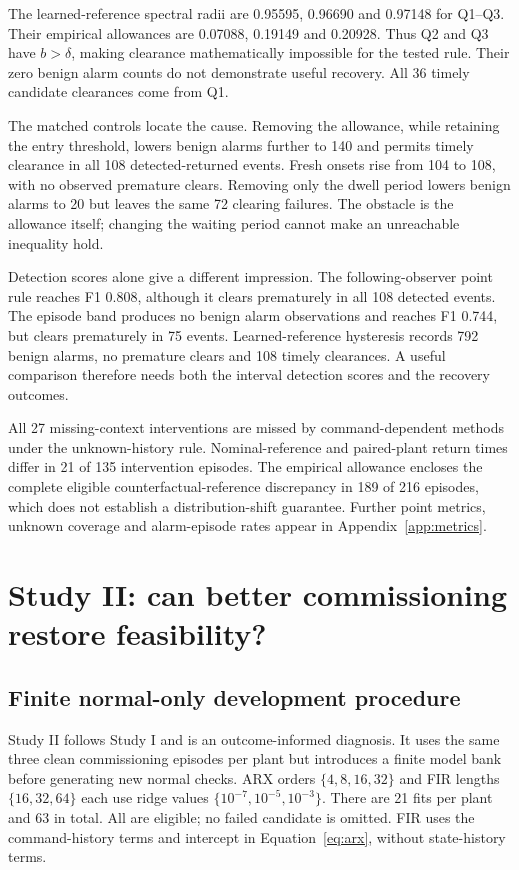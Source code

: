 \documentclass[11pt]{article}
\begin{document}
The learned-reference spectral radii are 0.95595, 0.96690 and 0.97148 for Q1--Q3. Their empirical allowances are 0.07088, 0.19149 and 0.20928. Thus Q2 and Q3 have $b>\delta$, making clearance mathematically impossible for the tested rule. Their zero benign alarm counts do not demonstrate useful recovery. All 36 timely candidate clearances come from Q1.

The matched controls locate the cause. Removing the allowance, while retaining the entry threshold, lowers benign alarms further to 140 and permits timely clearance in all 108 detected-returned events. Fresh onsets rise from 104 to 108, with no observed premature clears. Removing only the dwell period lowers benign alarms to 20 but leaves the same 72 clearing failures. The obstacle is the allowance itself; changing the waiting period cannot make an unreachable inequality hold.

Detection scores alone give a different impression. The following-observer point rule reaches F1 0.808, although it clears prematurely in all 108 detected events. The episode band produces no benign alarm observations and reaches F1 0.744, but clears prematurely in 75 events. Learned-reference hysteresis records 792 benign alarms, no premature clears and 108 timely clearances. A useful comparison therefore needs both the interval detection scores and the recovery outcomes.

All 27 missing-context interventions are missed by command-dependent methods under the unknown-history rule. Nominal-reference and paired-plant return times differ in 21 of 135 intervention episodes. The empirical allowance encloses the complete eligible counterfactual-reference discrepancy in 189 of 216 episodes, which does not establish a distribution-shift guarantee. Further point metrics, unknown coverage and alarm-episode rates appear in Appendix~\ref{app:metrics}.

\section{Study II: can better commissioning restore feasibility?}
\subsection{Finite normal-only development procedure}
Study II follows Study I and is an outcome-informed diagnosis. It uses the same three clean commissioning episodes per plant but introduces a finite model bank before generating new normal checks. ARX orders $\{4,8,16,32\}$ and FIR lengths $\{16,32,64\}$ each use ridge values $\{10^{-7},10^{-5},10^{-3}\}$. There are 21 fits per plant and 63 in total. All are eligible; no failed candidate is omitted. FIR uses the command-history terms and intercept in Equation~\ref{eq:arx}, without state-history terms.
\end{document}
